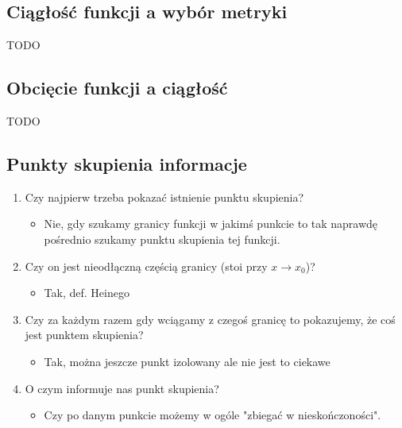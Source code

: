 \documentclass{article}
\begin{document}
\subsection{Ciągłość funkcji a wybór metryki}

\begin{center}
    TODO
\end{center}

\subsection{Obcięcie funkcji a ciągłość}

\begin{center}
    TODO
\end{center}

\subsection{Punkty skupienia informacje}

\begin{enumerate}
    \item Czy najpierw trzeba pokazać istnienie punktu skupienia?
    \begin{itemize}
        \item Nie, gdy szukamy granicy funkcji w jakimś punkcie to tak naprawdę pośrednio szukamy punktu skupienia tej funkcji.
    \end{itemize}
    \item Czy on jest nieodłączną częścią granicy (stoi przy \(x \to x_0\))?
    \begin{itemize}
        \item Tak, def. Heinego
    \end{itemize}
    \item Czy za każdym razem gdy wciągamy z czegoś granicę to pokazujemy, że coś jest punktem skupienia?
    \begin{itemize}
        \item Tak, można jeszcze punkt izolowany ale nie jest to ciekawe
    \end{itemize}
    \item O czym informuje nas punkt skupienia?
    \begin{itemize}
        \item Czy po danym punkcie możemy w ogóle "zbiegać w nieskończoności".
    \end{itemize}
\end{enumerate}
\end{document}
